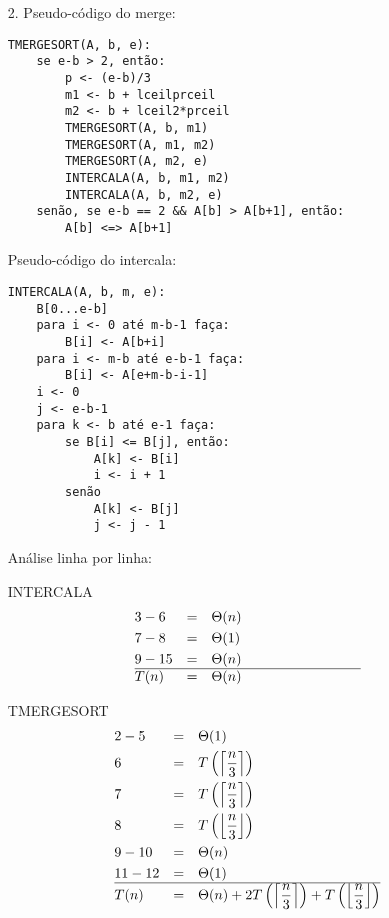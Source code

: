\documentclass[12pt, a4paper]{article} %
\begin{document}
\begin{enumerate}
\item[2.]
Pseudo-código do merge:
\begin{lstlisting}
TMERGESORT(A, b, e):
    se e-b > 2, então:
        p <- (e-b)/3
        m1 <- b + lceilprceil
        m2 <- b + lceil2*prceil
        TMERGESORT(A, b, m1)
        TMERGESORT(A, m1, m2)
        TMERGESORT(A, m2, e)
        INTERCALA(A, b, m1, m2)
        INTERCALA(A, b, m2, e)
    senão, se e-b == 2 && A[b] > A[b+1], então:
        A[b] <=> A[b+1]
\end{lstlisting}
Pseudo-código do intercala:
\begin{lstlisting}
INTERCALA(A, b, m, e):
    B[0...e-b]
    para i <- 0 até m-b-1 faça:
        B[i] <- A[b+i]
    para i <- m-b até e-b-1 faça:
        B[i] <- A[e+m-b-i-1]
    i <- 0
    j <- e-b-1
    para k <- b até e-1 faça:
        se B[i] <= B[j], então:
            A[k] <- B[i]
            i <- i + 1
        senão
            A[k] <- B[j]
            j <- j - 1
\end{lstlisting}
Análise linha por linha:\\
\begin{minipage}{0.45\textwidth}
INTERCALA
\begin{align*}
&3-6  &= \quad &\Theta(n)\\
&7-8  &= \quad &\Theta(1)\\
&9-15 &= \quad &\Theta(n)\\
\hline
&T(n) &= \quad &\Theta(n) \hspace{3cm}
\end{align*}
\end{minipage}
\hfill
\begin{minipage}{0.45\textwidth}
TMERGESORT
\begin{align*}
&2-5   &= \quad &\Theta(1)\\
&6     &= \quad &T\left(\Big\lceil \frac{n}{3} \Big\rceil\right)\\
&7     &= \quad &T\left(\Big\lceil \frac{n}{3} \Big\rceil\right)\\
&8     &= \quad &T\left(\Big\lfloor \frac{n}{3} \Big\rfloor\right)\\
&9-10  &= \quad &\Theta(n)\\
&11-12 &= \quad &\Theta(1)\\
\hline
&T(n) &= \quad &\Theta(n) + 2T\left(\Big\lceil \frac{n}{3} \Big\rceil\right) + T\left(\Big\lfloor \frac{n}{3} \Big\rfloor\right)\\
\end{align*}
\end{minipage}

\end{enumerate}
\end{document}
